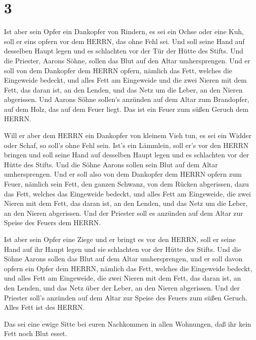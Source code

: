 \hypertarget{section-2}{%
\section{3}\label{section-2}}

 Ist aber sein Opfer ein Dankopfer von Rindern, es sei ein
Ochse oder eine Kuh, soll er eins opfern vor dem HERRN, das ohne Fehl
sei.  Und soll seine Hand auf desselben Haupt legen und es
schlachten vor der Tür der Hütte des Stifts. Und die Priester, Aarons
Söhne, sollen das Blut auf den Altar umhersprengen.  Und er
soll von dem Dankopfer dem HERRN opfern, nämlich das Fett, welches die
Eingeweide bedeckt, und alles Fett am Eingeweide  und die
zwei Nieren mit dem Fett, das daran ist, an den Lenden, und das Netz um
die Leber, an den Nieren abgerissen.  Und Aarons Söhne
sollen's anzünden auf dem Altar zum Brandopfer, auf dem Holz, das auf
dem Feuer liegt. Das ist ein Feuer zum süßen Geruch dem HERRN.

 Will er aber dem HERRN ein Dankopfer von kleinem Vieh tun,
es sei ein Widder oder Schaf, so soll's ohne Fehl sein. 
Ist's ein Lämmlein, soll er's vor den HERRN bringen  und
soll seine Hand auf desselben Haupt legen und es schlachten vor der
Hütte des Stifts. Und die Söhne Aarons sollen sein Blut auf dem Altar
umhersprengen.  Und er soll also von dem Dankopfer dem HERRN
opfern zum Feuer, nämlich sein Fett, den ganzen Schwanz, von dem Rücken
abgerissen, dazu das Fett, welches das Eingeweide bedeckt, und alles
Fett am Eingeweide,  die zwei Nieren mit dem Fett, das
daran ist, an den Lenden, und das Netz um die Leber, an den Nieren
abgerissen.  Und der Priester soll es anzünden auf dem
Altar zur Speise des Feuers dem HERRN.

 Ist aber sein Opfer eine Ziege und er bringt es vor den
HERRN,  soll er seine Hand auf ihr Haupt legen und sie
schlachten vor der Hütte des Stifts. Und die Söhne Aarons sollen das
Blut auf dem Altar umhersprengen,  und er soll davon opfern
ein Opfer dem HERRN, nämlich das Fett, welches die Eingeweide bedeckt,
und alles Fett am Eingeweide,  die zwei Nieren mit dem
Fett, das daran ist, an den Lenden, und das Netz über der Leber, an den
Nieren abgerissen.  Und der Priester soll's anzünden auf
dem Altar zur Speise des Feuers zum süßen Geruch. Alles Fett ist des
HERRN.

 Das sei eine ewige Sitte bei euren Nachkommen in allen
Wohnungen, daß ihr kein Fett noch Blut esset.

